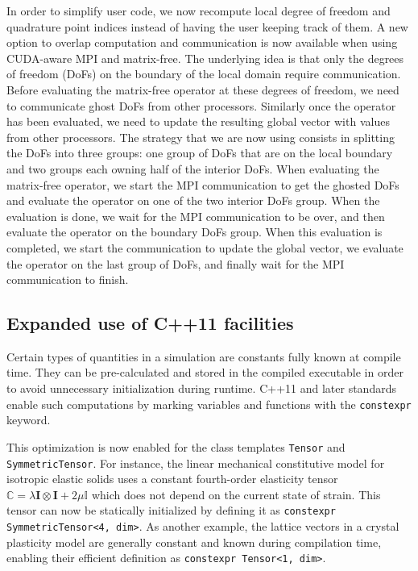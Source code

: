 \documentclass{ansarticle-preprint}
\begin{document}
In order to simplify user code, we now recompute
local degree of freedom and quadrature point indices instead of having the user
keeping track of them. A new option to overlap computation and communication is
now available when using CUDA-aware MPI and matrix-free. The underlying idea is
that only the degrees of freedom (DoFs) on the boundary of the local domain
require communication. Before evaluating the matrix-free operator at these
degrees of freedom, we need to communicate ghost DoFs from other
processors.  Similarly once the operator has been evaluated, we need to update
the resulting global vector with values from other processors. The strategy that
we are now using consists in splitting the DoFs into three groups: one group of DoFs
that are on the local boundary and two groups each owning half of the interior
DoFs. When evaluating the matrix-free operator, we start the MPI communication
to get the ghosted DoFs and evaluate the operator on one of the two interior
DoFs group. When the evaluation is done, we wait for the MPI
communication to be over, and
then evaluate the operator on the boundary DoFs group. When this evaluation is
completed, we start the communication to update the global vector, we evaluate the
operator on the last group of DoFs, and finally wait for the MPI
communication to finish.


\subsection{Expanded use of C++11 facilities}
\label{subsec:cxx}

Certain types of quantities in a simulation are constants fully known
at compile time. They can be pre-calculated and stored in the
compiled executable in order to avoid unnecessary initialization during
runtime. C++11 and later standards enable such computations by
marking variables and functions with the \texttt{constexpr} keyword.

This optimization is now enabled for the class templates
\texttt{Tensor} and \texttt{SymmetricTensor}.
For instance, the linear mechanical constitutive model for isotropic elastic solids
uses a constant fourth-order elasticity tensor
$\mathbb{C} = \lambda \boldsymbol{I} \otimes \boldsymbol{I} + 2 \mu \mathbb{I}$
which does not depend on the current state of strain.
This tensor can now be statically initialized by defining it as
\texttt{constexpr SymmetricTensor<4, dim>}.
As another example, the lattice vectors in a crystal plasticity model are generally
constant and known during compilation time, enabling their efficient definition as
\texttt{constexpr Tensor<1, dim>}.
\end{document}
